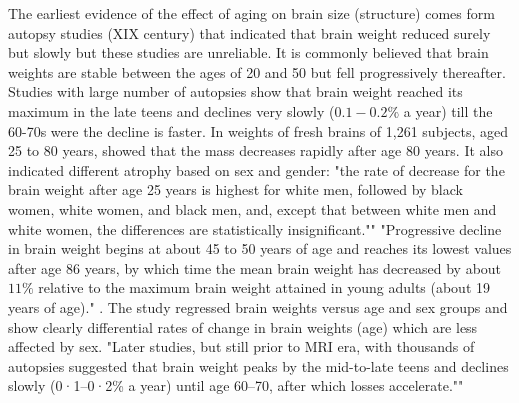 \documentclass[twoside,onecolumn]{article}
\begin{document}
The earliest evidence of the effect of aging on brain size (structure) comes form autopsy studies (XIX century) that indicated that brain weight reduced surely but slowly but these studies are unreliable.
It is commonly believed that brain weights are stable between the ages of 20 and 50 but fell progressively thereafter. Studies with large number of autopsies show that brain weight reached its maximum in the late teens and declines very slowly ($0.1-0.2\%$ a year) till the 60-70s were the decline is faster.
In \cite{ho1980analysis} weights of fresh brains of 1,261 subjects, aged 25 to 80 years, showed that the mass decreases rapidly after age 80 years. It also indicated  different atrophy based on sex and gender: "the rate of decrease for the brain weight after age 25 years is highest for white men, followed by black women, white women, and black men, and, except that between white men and white women, the differences are statistically insignificant.""
"Progressive decline in brain weight begins at about 45 to 50 years of age and reaches its lowest values after age 86 years, by which time the mean brain weight has decreased by about $11\%$ relative to the maximum brain weight attained in young adults (about 19 years of age)." \cite{dekaban1978changes}. The study regressed brain weights versus age and sex groups and show clearly differential rates of change in brain weights (age) which are less affected by sex.
"Later studies, but still prior to MRI era, with thousands of autopsies suggested that brain weight peaks by the mid-to-late teens and declines slowly (0·1–0·2\% a year) until age 60–70, after which losses accelerate.""
\end{document}
